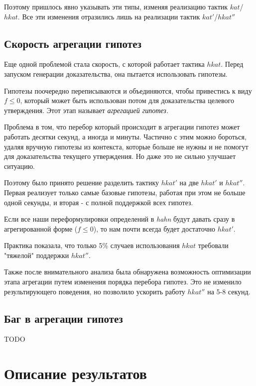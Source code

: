 \documentclass[times
              ]{itmo-student-thesis}
\begin{document}
      Поэтому пришлось явно указывать эти типы, изменяя реализацию тактик $ kat $/$ hkat $.
      Все эти изменения отразились лишь на реализации тактик $ kat' $/$ hkat'' $

    \subsection{Скорость агрегации гипотез}

      Еще одной проблемой стала скорость, с которой работает тактика $ hkat $.
      Перед запуском генерации доказательства, она пытается использовать гипотезы.

      Гипотезы поочередно переписываются и объединяются, чтобы привестись к виду $ f \leq 0 $, который может быть использован потом для доказательства целевого утверждения.
      Этот этап называет \textit{агрегацией гипотез.}

      Проблема в том, что перебор который происходит в агрегации гипотез может работать десятки секунд, а иногда и минуты.
      Частично с этим можно бороться, удаляя вручную гипотезы из контекста, которые больше не нужны и не помогут для доказательства текущего утверждения.
      Но даже это не сильно улучшает ситуацию.

      Поэтому было принято решение разделить тактику $ hkat' $ на две $ hkat' $ и $ hkat'' $.
      Первая реализует только самые базовые гипотезы, работая при этом не больше одной секунды, и вторая - с полной поддержкой всех гипотез.

      Если все наши переформулировки определений в  \textit{hahn} будут давать сразу в агрегированной форме ($ f \leq 0 $),
      то нам почти всегда будет достаточно $ hkat' $.

      Практика показала, что только 5\% случаев использования $ hkat $ требовали "тяжелой" поддержки $ hkat'' $.

      Также после внимательного анализа была обнаружена возможность оптимизации этапа агрегации путем изменения порядка перебора гипотез.
      Это не изменило результирующего поведения, но позволило ускорить работу $ hkat'' $ на 5-8 секунд.

    \subsection{Баг в агрегации гипотез}

      TODO

  \section{Описание результатов}
\end{document}

